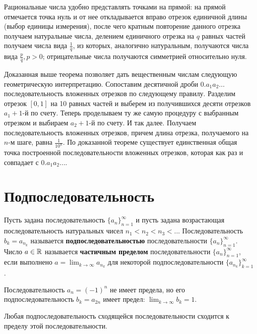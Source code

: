 	Рациональные числа удобно представлять точками на прямой: на прямой отмечается точка нуль и от нее откладывается вправо отрезок единичной длины (выбор единицы измерения), после чего кратным повторение данного отрезка получаем натуральные числа, делением единичного отрезка на $q$ равных частей получаем числа вида $\frac{1}{q}$, из которых, аналогично натуральным, получаются числа вида $\frac{p}{q}, p > 0$; отрицательные числа получаются симметрией относительно нуля.
	
	Доказанная выше теорема позволяет дать вещественным числам следующую геометрическую интерпретацию. Сопоставим десятичной дроби $0.a_1 a_2 ...$ последовательность вложенных отрезков по следующему правилу. Разделим отрезок $[0, 1]$ на 10 равных частей и выберем из получившихся десяти отрезков $a_1 + 1$-й по счету. Теперь проделываем ту же самую процедуру с выбранным отрезком и выбираем $a_2 + 1$-й по счету. И так далее. Получаем последовательность вложенных отрезков, причем длина отрезка, получаемого на $n$-м шаге, равна $\frac{1}{10^n}$. По доказанной теореме существует единственная общая точка построенной последовательности вложенных отрезков, которая как раз и совпадает с $0.a_1 a_2 ...$.
	
	\section{Подпоследовательность}
	
	\begin{theorem}
		Пусть задана последовательность $\{a_n\}^{\infty}_{n = 1}$ и пусть задана
		возрастающая последовательность натуральных чисел $n_1 < n_2 < n_3 < ...$ Последовательность $b_k = a_{n_k}$ называется \textbf{подпоследовательностью} последовательности $\{a_n\}^{\infty}_{n = 1}$. Число $a \in \mathbb R$ называется \textbf{частичным пределом} последовательности $\{a_n\}^{\infty}_{n = 1}$, если выполнено $a = \lim_{k \to \infty} a_{n_k}$ для некоторой подпоследовательности $\{a_{n_k}\}^{\infty}_{k = 1}$.
	\end{theorem}
	
	\begin{mention}
		Последовательность $a_n = (-1)^n$ не имеет предела, но его подпоследовательность $b_k = a_{2n}$ имеет предел: $\lim_{k \to \infty} b_k = 1$.
	\end{mention}
	
	\begin{sentence}
		Любая подпоследовательность сходящейся последовательности сходится к пределу этой последовательности.
	\end{sentence}
	
